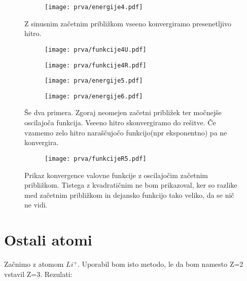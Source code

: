 \documentclass{article}
\begin{document}
\begin{figure}[H]
\centering
\begin{subfigure}{.6\textwidth}
\texttt{[image: prva/energije4.pdf]}
\end{subfigure}
\caption*{Z sinusnim začetnim približkom vseeno konvergiramo presenetljivo hitro.}
\end{figure}

\begin{figure}[H]
\centering
\begin{subfigure}{.45\textwidth}
\texttt{[image: prva/funkcije4U.pdf]}
\end{subfigure}
\begin{subfigure}{.45\textwidth}
\texttt{[image: prva/funkcije4R.pdf]}
\end{subfigure}
\caption*{}
\end{figure}

\begin{figure}[H]
\centering
\begin{subfigure}{.45\textwidth}
\texttt{[image: prva/energije5.pdf]}
\end{subfigure}
\begin{subfigure}{.45\textwidth}
\texttt{[image: prva/energije6.pdf]}
\end{subfigure}
\caption*{Še dva primera. Zgoraj neomejen začetni približek ter močnejše oscilajoča funkcija. Vseeno hitro skonvergiramo do rešitve. Če vzamemo zelo hitro naraščujočo funkcijo(npr eksponentno) pa ne konvergira.}
\end{figure}

\begin{figure}[H]
\centering
\begin{subfigure}{.6\textwidth}
\texttt{[image: prva/funkcijeR5.pdf]}
\end{subfigure}
\caption*{Prikaz konvergence valovne funkcije z oscilajočim začetnim približkom. Tistega z kvadratičnim ne bom prikazoval, ker so razlike med začetnim približkom in dejansko funkcijo tako veliko, da se nič ne vidi.}
\end{figure}

\section{Ostali atomi}

Začnimo z atomom $Li^{+}$. Uporabil bom isto metodo, le da bom namesto Z=2 vstavil Z=3. Rezulati:
\end{document}
